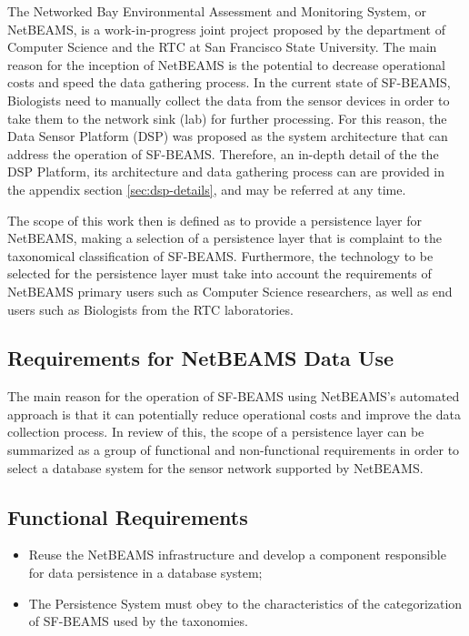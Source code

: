 The Networked Bay Environmental Assessment and Monitoring System, or NetBEAMS, 
is a work-in-progress joint project proposed by the department of Computer
Science and the RTC at San Francisco State University. The main reason for the
inception of NetBEAMS is the potential to decrease operational costs and speed
the data gathering process. In the current state of SF-BEAMS, Biologists need
to manually collect the data from the sensor devices in order to take them to
the network sink (lab) for further processing. For this reason, the Data
Sensor Platform (DSP) \cite{netbeams2009} was proposed as the system
architecture that can address the operation of SF-BEAMS. Therefore, an in-depth
detail of the the DSP Platform, its architecture and data gathering process
can are provided in the appendix section \ref{sec:dsp-details}, and may be
referred at any time.

The scope of this work then is defined as to provide a persistence layer for
NetBEAMS, making a selection of a persistence layer that is complaint to the
taxonomical classification of SF-BEAMS. Furthermore, the technology to be
selected for the persistence layer must take into account the requirements of
NetBEAMS primary users such as Computer Science researchers, as well as end
users such as Biologists from the RTC laboratories.

\subsection{Requirements for NetBEAMS Data Use}

The main reason for the operation of SF-BEAMS using NetBEAMS's automated
approach is that it can potentially reduce operational costs and improve the
data collection process. In review of this, the scope of a persistence layer
can be summarized as a group of functional and non-functional requirements in
order to select a database system for the sensor network supported by NetBEAMS.

\subsection{Functional Requirements}

\begin{itemize}
  \item Reuse the NetBEAMS infrastructure and develop a component responsible
  for data persistence in a database system;
  \item The Persistence System must obey to the characteristics of the
  categorization of SF-BEAMS used by the taxonomies. 
\end{itemize}

